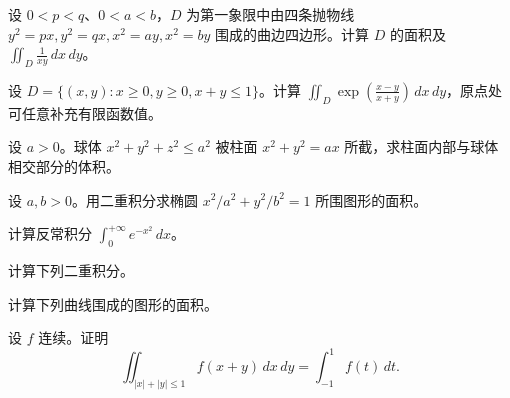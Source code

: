 \newpage
\noindent\begin{minipage}{\textwidth}
设 $0<p<q$、$0<a<b$，$D$ 为第一象限中由四条抛物线 $y^2=px,y^2=qx,x^2=ay,x^2=by$ 围成的曲边四边形。计算 $D$ 的面积及 $\iint_D\frac1{xy}\,dx\,dy$。
\end{minipage}\par\vfill
\noindent\begin{minipage}{\textwidth}
设 $D=\{(x,y):x\ge0,y\ge0,x+y\le1\}$。计算 $\displaystyle\iint_D\exp\!\left(\frac{x-y}{x+y}\right)\,dx\,dy$，原点处可任意补充有限函数值。
\end{minipage}\par\vfill
\noindent\begin{minipage}{\textwidth}
设 $a>0$。球体 $x^2+y^2+z^2\le a^2$ 被柱面 $x^2+y^2=ax$ 所截，求柱面内部与球体相交部分的体积。
\end{minipage}\par\vfill
\newpage
\noindent\begin{minipage}{\textwidth}
设 $a,b>0$。用二重积分求椭圆 $x^2/a^2+y^2/b^2=1$ 所围图形的面积。
\end{minipage}\par\vfill
\noindent\begin{minipage}{\textwidth}
计算反常积分 $\displaystyle\int_0^{+\infty}e^{-x^2}\,dx$。
\end{minipage}\par\vfill
\noindent\begin{minipage}{\textwidth}
计算下列二重积分。
\end{minipage}\par\vfill
\newpage
\noindent\begin{minipage}{\textwidth}
计算下列曲线围成的图形的面积。
\end{minipage}\par\vfill
\noindent\begin{minipage}{\textwidth}
设 $f$ 连续。证明\[\iint_{|x|+|y|\le1}f(x+y)\,dx\,dy=\int_{-1}^1f(t)\,dt.\]
\end{minipage}\par\vfill
